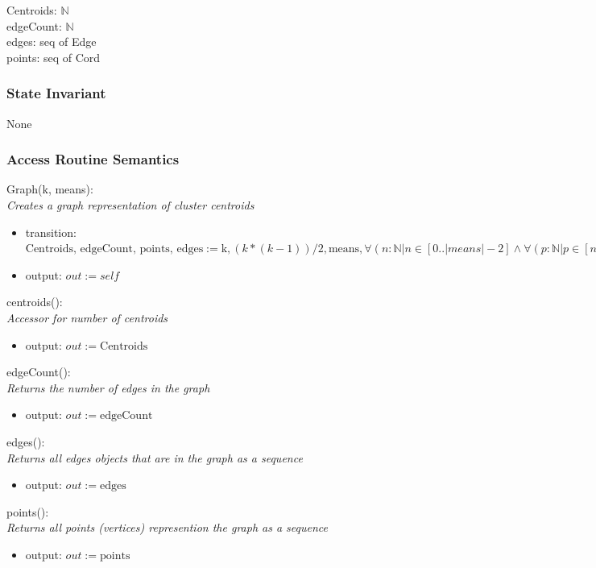 \documentclass[12pt]{article}
\begin{document}
Centroids: $\mathbb{N}$ \\
edgeCount: $\mathbb{N}$ \\
edges: seq of Edge\\
points: seq of Cord

\subsubsection* {State Invariant}

None

\subsubsection* {Access Routine Semantics}

Graph(k, means):\\
\textit{Creates a graph representation of cluster centroids}
\begin{itemize}
\item transition: $\mbox{Centroids, edgeCount, points, edges} :=
                   \mbox{k}, (k*(k-1))/2, \mbox{means}, 
                   \forall (n : \mathbb{N} | n \in [0..|means|-2] \land 
                   \forall (p : \mathbb{N} | p \in [n+1..|means|-1] \land n \neq p) :
                   \mbox{Edge}(\mbox{edges.get}(n),\mbox{edges.get}(p)))$
\item output: $out := \mathit{self}$
\end{itemize}

\noindent
centroids():\\
\textit{Accessor for number of centroids}
\begin{itemize}
\item output: $out := \mbox{Centroids}$
\end{itemize}

\noindent
edgeCount():\\
\textit{Returns the number of edges in the graph}
\begin{itemize}
\item output: $out := \mbox{edgeCount}$
\end{itemize}

\noindent
edges():\\
\textit{Returns all edges objects that are in the graph as a sequence}
\begin{itemize}
\item output: $out := \mbox{edges}$
\end{itemize}

\noindent
points():\\
\textit{Returns all points (vertices) represention the graph as a sequence}
\begin{itemize}
\item output: $out := \mbox{points}$
\end{itemize}
\end{document}

